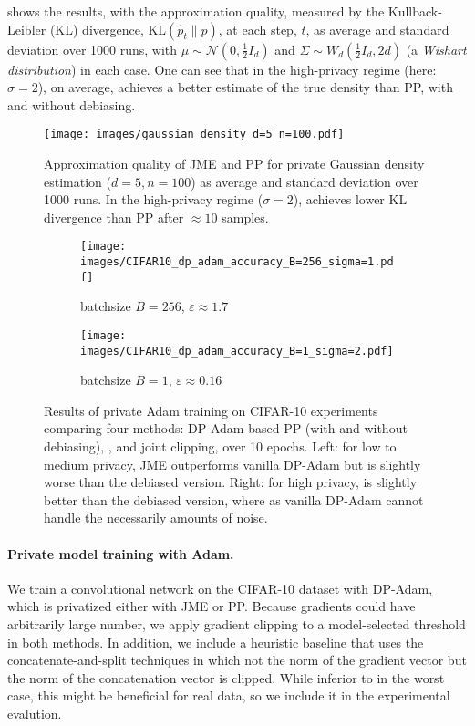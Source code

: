  shows the results, with the approximation quality,
measured by the Kullback-Leibler (KL) divergence, $\text{KL}(\widehat p_t\|p)$, at each 
step, $t$, as average and standard deviation over 1000 runs, with 
$\mu \sim \mathcal{N}(0, \frac{1}{2}I_d)$ and $\Sigma \sim W_d\left(\frac{1}{2}I_d, 2d\right)$
(\ie a \emph{Wishart distribution}) in each case.
%
One can see that in the high-privacy regime (here: $\sigma = 2$), on average, 
\acronym achieves a better estimate of the true density than PP, with and without 
debiasing.
%

\begin{figure}[t]
    \centering
    \texttt{[image: images/gaussian\_density\_d=5\_n=100.pdf]}
    \caption{Approximation quality of JME and PP for private Gaussian density estimation ($d=5, n=100$) as average and standard deviation over 1000 runs. In the high-privacy regime ($\sigma = 2$), \acronym achieves lower KL divergence than PP after  $\approx 10$ samples.}
    \label{fig:covariance_over_steps}
\end{figure}

\begin{figure}[h]
    \centering
    \begin{subfigure}[c]{.48\linewidth}\scriptsize
    \texttt{[image: images/CIFAR10\_dp\_adam\_accuracy\_B=256\_sigma=1.pdf]}
    \caption{batchsize $B\!=\!256$, $\varepsilon \approx 1.7$}
    \end{subfigure}
    \begin{subfigure}[c]{.48\linewidth}\scriptsize
    \texttt{[image: images/CIFAR10\_dp\_adam\_accuracy\_B=1\_sigma=2.pdf]}
    \caption{batchsize $B\!=\!1$, $\varepsilon \approx 0.16$}
    \end{subfigure}
    
    \caption{Results of private Adam training on CIFAR-10 experiments comparing four methods: DP-Adam based PP (with and without debiasing), \acronym, and joint clipping, over 10 epochs. 
    Left: for low to medium privacy, JME outperforms vanilla DP-Adam but is slightly worse than the debiased version. Right: for high privacy, \acronym is slightly better than the debiased version, where as vanilla DP-Adam cannot handle the necessarily amounts of noise.}
    \label{fig:cifar_10}
\end{figure}

\paragraph{Private model training with Adam.}
%
We train a convolutional network on the CIFAR-10 dataset with DP-Adam, 
which is privatized either with JME or PP.
%
Because gradients could have arbitrarily large number, we apply gradient clipping
to a model-selected threshold in both methods. 
%
In addition, we include a heuristic baseline that uses the concatenate-and-split 
techniques in which not the norm of the gradient vector but the norm of the 
concatenation vector is clipped. 
%
While inferior to \acronym in the worst case, this might be beneficial for real data,
so we include it in the experimental evalution.

